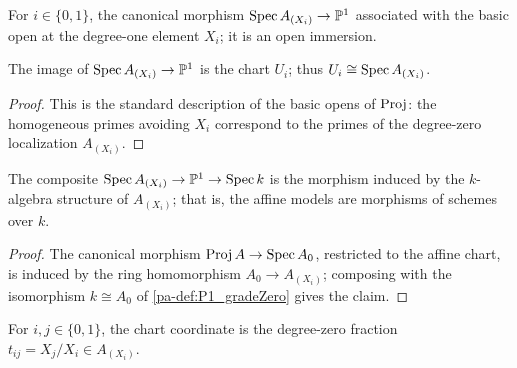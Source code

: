\begin{definition}
  \label{pa-def:P1_chartIota}
  \leanok

  For \(i \in \{0,1\}\), the canonical morphism \(\operatorname{Spec} A_{(X_i)} \to \mathbb{P}^1\) associated with
  the basic open at the degree-one element \(X_i\); it is an open immersion.
\end{definition}

\begin{lemma}
  \label{pa-lem:P1_chartIota_range}
  \leanok

  The image of \(\operatorname{Spec} A_{(X_i)} \to \mathbb{P}^1\) is the chart \(U_i\); thus
  \(U_i \cong \operatorname{Spec} A_{(X_i)}\).
\end{lemma}
\begin{proof}
  \leanok
  This is the standard description of the basic opens of \(\operatorname{Proj}\): the homogeneous primes
  avoiding \(X_i\) correspond to the primes of the degree-zero localization \(A_{(X_i)}\).
\end{proof}

\begin{lemma}
  \label{pa-lem:P1_chartIota_structureMap}
  \leanok

  The composite \(\operatorname{Spec} A_{(X_i)} \to \mathbb{P}^1 \to \operatorname{Spec} k\) is the morphism induced by the
  \(k\)-algebra structure of \(A_{(X_i)}\); that is, the affine models are morphisms of
  schemes over \(k\).
\end{lemma}
\begin{proof}
  \leanok
  The canonical morphism \(\operatorname{Proj} A \to \operatorname{Spec} A_0\), restricted to the affine chart, is induced
  by the ring homomorphism \(A_0 \to A_{(X_i)}\); composing with the isomorphism
  \(k \cong A_0\) of \ref{pa-def:P1_gradeZero} gives the claim.
\end{proof}

\begin{definition}
  \label{pa-def:P1_chartCoord}
  \leanok

  For \(i, j \in \{0,1\}\), the chart coordinate is the degree-zero fraction
  \(t_{ij} = X_j / X_i \in A_{(X_i)}\).
\end{definition}


